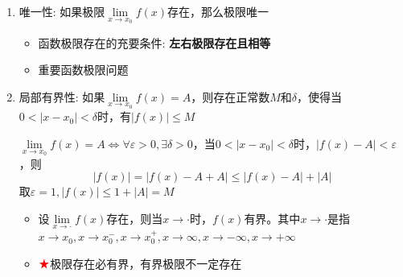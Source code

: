 \documentclass[../book.tex]{subfiles}
\begin{document}
    \begin{enumerate}
        \item 唯一性: 如果极限$\lim\limits_{x\to{x_0}}f(x)$存在，那么极限唯一
        \begin{itemize}
            \item 函数极限存在的充要条件: \textbf{左右极限存在且相等}
            \item 重要函数极限问题
        \end{itemize}
        \item 局部有界性: 如果$\lim\limits_{x\to{x_0}}f(x) = A$，则存在正常数$M$和$\delta$，使得当$0 < |x - x_0| < \delta$时，有$|f(x)| \leq M$
        \begin{analysisbox}[证明]
            $\lim\limits_{x\to{x_0}}f(x) = A \Leftrightarrow \forall \varepsilon > 0, \exists \delta > 0$，当$0 < |x - x_0| < \delta$时，$|f(x) - A| < \varepsilon$，则
            \[
                |f(x)| = |f(x) - A + A| \leq |f(x) - A| + |A|
            \]
            取$\varepsilon = 1, |f(x)| \leq 1 + |A| = M$
        \end{analysisbox}
        \begin{itemize}
            \item 设$\lim\limits_{x\to \cdot} f(x)$存在，则当$x\to \cdot$时，$f(x)$有界。其中$x\to \cdot$是指$x\to x_0, x\to x_0^-, x\to x_0^+, x\to \infty, x\to -\infty, x\to +\infty$
            \item $\color{red}{\bigstar}$极限存在必有界，有界极限不一定存在

\end{itemize}
\end{enumerate}
\end{document}
